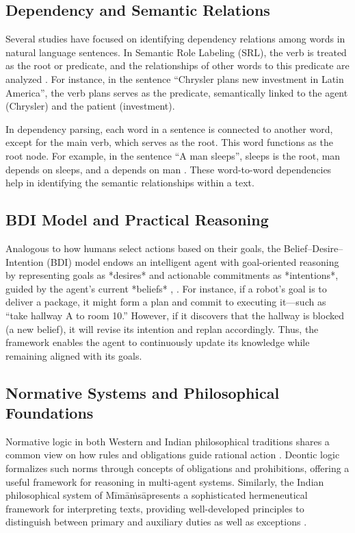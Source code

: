 \documentclass[a4paper,11pt]{lmcs}
\newcommand{\mimamsa}{M\={i}m\={a}\.ms\={a}}
\begin{document}
\subsection*{Dependency and Semantic Relations}
Several studies have focused on identifying dependency relations among words in natural language sentences. In Semantic Role Labeling (SRL), the verb is treated as the root or predicate, and the relationships of other words to this predicate are analyzed \citep{srl}. For instance, in the sentence “Chrysler plans new investment in Latin America”, the verb plans serves as the predicate, semantically linked to the agent (Chrysler) and the patient (investment).

In dependency parsing, each word in a sentence is connected to another word, except for the main verb, which serves as the root. This word functions as the root node. For example, in the sentence “A man sleeps”, sleeps is the root, man depends on sleeps, and a depends on man \citep{srl_survey}.  These word-to-word dependencies help in identifying the semantic relationships within a text.
\subsection*{BDI Model and Practical Reasoning}
Analogous to how humans select actions based on their goals, the Belief–Desire–Intention (BDI) model endows an intelligent agent with goal-oriented reasoning by representing goals as *desires* and actionable commitments as *intentions*, guided by the agent’s current *beliefs* \citep{bdi}, \citep{bdi_reasoning}. For instance, if a robot’s goal is to deliver a package, it might form a plan and commit to executing it—such as “take hallway A to room 10.” However, if it discovers that the hallway is blocked (a new belief), it will revise its intention and replan accordingly. Thus, the framework enables the agent to continuously update its knowledge while remaining aligned with its goals.


\subsection*{Normative Systems and Philosophical Foundations}
Normative logic in both Western and Indian philosophical traditions shares a common view on how rules and obligations guide rational action \citep{sanyal}. Deontic logic formalizes such norms through concepts of obligations and prohibitions, offering a useful framework for reasoning in multi-agent systems. Similarly, the Indian philosophical system of \mimamsa presents a sophisticated hermeneutical framework for interpreting texts, providing well-developed principles to distinguish between primary and auxiliary duties as well as exceptions \citep{davis}.
\end{document}
